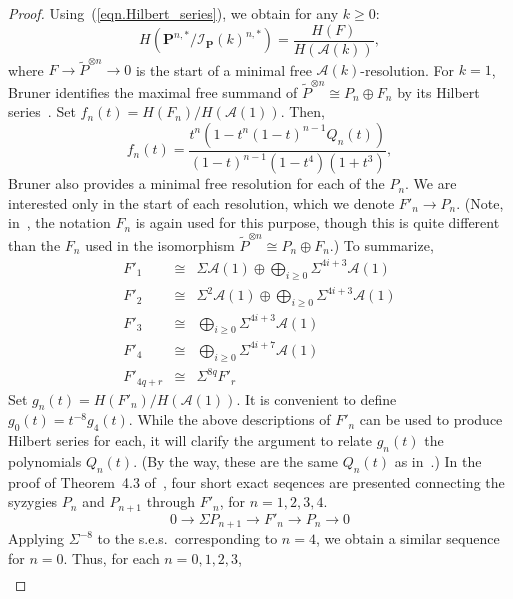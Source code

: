 \documentclass{amsart}
\theoremstyle{plain}
\theoremstyle{definition}
\theoremstyle{remark}
\begin{document}
\begin{proof}
  Using~(\ref{eqn.Hilbert_series}), we obtain for any $k \geq 0$:
  \[
    H(\mathbf{P}^{n,*}/ \mathcal{I}_{\mathbf{P}}(k)^{n,*}) =
    \frac{H(F)}{H(\mathcal{A}(k))},
  \]
  where $F \to \widetilde{P}^{\otimes n} \to 0$ is the start of a
  minimal free $\mathcal{A}(k)$-resolution.  For $k=1$, Bruner
  identifies the maximal free summand of $\widetilde{P}^{\otimes n}
  \cong P_n \oplus F_n$ by its Hilbert series~\cite{Bruner}.  Set
  $f_n(t) = H(F_n)/H(\mathcal{A}(1))$.  Then,
  \begin{equation}\label{eqn.f_n(t)}
    f_n(t) =
    \frac{t^n\left(1-t^n(1-t)^{n-1}Q_n(t)\right)}{(1-t)^{n-1}(1-t^4)(1+t^3)},
  \end{equation}
  Bruner also provides a minimal free resolution for each of the
  $P_n$.  We are interested only in the start of each resolution,
  which we denote $F'_n \to P_n$.  (Note, in~\cite{Bruner}, the
  notation $F_n$ is again used for this purpose, though this is quite
  different than the $F_n$ used in the isomorphism
  $\widetilde{P}^{\otimes n} \cong P_n \oplus F_n$.)  To summarize,
  \begin{eqnarray*}
    F'_1 &\cong& \Sigma\mathcal{A}(1) \oplus \bigoplus_{i \geq 0}
    \Sigma^{4i+3} \mathcal{A}(1)\\ F'_2 &\cong& \Sigma^2\mathcal{A}(1)
    \oplus \bigoplus_{i \geq 0} \Sigma^{4i+3} \mathcal{A}(1)\\ F'_3
    &\cong& \bigoplus_{i \geq 0} \Sigma^{4i+3} \mathcal{A}(1)\\ F'_4
    &\cong& \bigoplus_{i \geq 0} \Sigma^{4i+7}
    \mathcal{A}(1)\\ F'_{4q+r} &\cong& \Sigma^{8q}F'_{r}
  \end{eqnarray*}    
  Set $g_n(t) = H(F'_n)/H(\mathcal{A}(1))$.  It is convenient to
  define $g_0(t) = t^{-8}g_4(t)$.  While the above descriptions of
  $F'_n$ can be used to produce Hilbert series for each, it will
  clarify the argument to relate $g_n(t)$ the polynomials $Q_n(t)$.
  (By the way, these are the same $Q_n(t)$ as in~\cite{Bruner}.)  In
  the proof of Theorem~4.3 of~\cite{Bruner}, four short exact seqences
  are presented connecting the syzygies $P_n$ and $P_{n+1}$ through
  $F'_n$, for $n = 1, 2, 3, 4$.
  \[
    0 \longrightarrow \Sigma P_{n+1} \longrightarrow F'_n
    \longrightarrow P_n \longrightarrow 0
  \]
  Applying $\Sigma^{-8}$ to the s.e.s.~corresponding to $n=4$, we
  obtain a similar sequence for $n=0$.  Thus, for each $n = 0, 1, 2,
  3$,
  \begin{eqnarray*}

\end{eqnarray*}
\end{proof}
\end{document}
